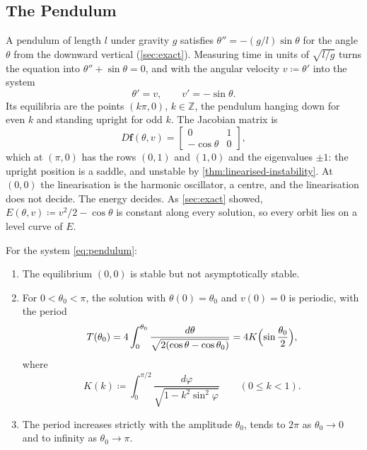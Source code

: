 \subsection{The Pendulum}

A pendulum of length $l$ under gravity $g$ satisfies $\theta''=-(g/l)\sin\theta$ for the angle $\theta$ from the downward vertical (\cref{sec:exact}). Measuring time in units of $\sqrt{l/g}$ turns the equation into $\theta''+\sin\theta=0$, and with the angular velocity $v\coloneqq\theta'$ into the system
\begin{equation}
\theta'=v,\qquad v'=-\sin\theta .
\label{eq:pendulum}
\end{equation}
Its equilibria are the points $(k\pi,0)$, $k\in\mathbb Z$, the pendulum hanging down for even $k$ and standing upright for odd $k$. The Jacobian matrix is
\[
D\mathbf f(\theta,v)=\begin{bmatrix}0&1\\-\cos\theta&0\end{bmatrix},
\]
which at $(\pi,0)$ has the rows $(0,1)$ and $(1,0)$ and the eigenvalues $\pm1$: the upright position is a saddle, and unstable by \cref{thm:linearised-instability}. At $(0,0)$ the linearisation is the harmonic oscillator, a centre, and the linearisation does not decide. The energy decides. As \cref{sec:exact} showed, $E(\theta,v)\coloneqq v^2/2-\cos\theta$ is constant along every solution, so every orbit lies on a level curve of $E$.

\begin{proposition}
\label{prop:pendulum}
For the system \eqref{eq:pendulum}:
\begin{enumerate}
\item The equilibrium $(0,0)$ is stable but not asymptotically stable.
\item For $0<\theta_0<\pi$, the solution with $\theta(0)=\theta_0$ and $v(0)=0$ is periodic, with the period
\[
T(\theta_0)=4\int_0^{\theta_0}\frac{d\theta}{\sqrt{2(\cos\theta-\cos\theta_0)}}=4K\Bigl(\sin\frac{\theta_0}2\Bigr),
\]
where
\[
K(k)\coloneqq\int_0^{\pi/2}\frac{d\varphi}{\sqrt{1-k^2\sin^2\varphi}}\qquad(0\le k<1).
\]
\item The period increases strictly with the amplitude $\theta_0$, tends to $2\pi$ as $\theta_0\to0$ and to infinity as $\theta_0\to\pi$.
\end{enumerate}
\end{proposition}

